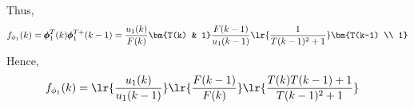 Thus,
\begin{align*}
        f_{\phi_1}(k) &= \pmb\phi_1^T(k) \pmb \phi_1^{T+}(k-1)
                      = \frac{u_1(k)}{F(k)} \bm{T(k) & 1} \frac{F(k-1)}{u_1(k-1)}
                      \lr{\frac{1}{T(k-1)^2 + 1}} \bm{T(k-1) \\ 1}\\
\end{align*}
Hence,
\begin{align}
        f_{\phi_1}(k) &= \lr{\frac{u_1(k)}{u_1(k-1)}} \lr{\frac{F(k-1)}{F(k)}} \lr{\frac{T(k)T(k-1) + 1}{T(k-1)^2 + 1}}
\end{align}
